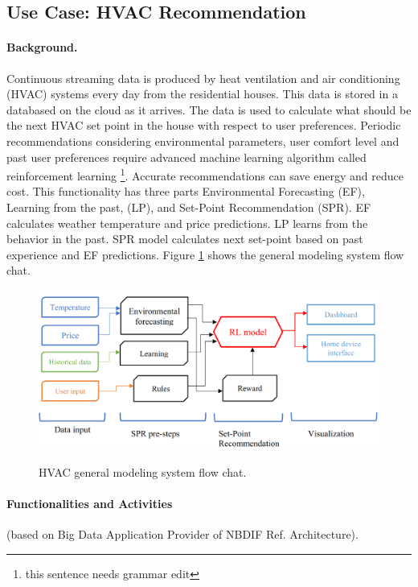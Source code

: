 \subsection{Use Case: HVAC Recommendation}


\paragraph*{Background.}

Continuous streaming data is produced by heat ventilation and air conditioning (HVAC) systems every
day from the residential houses. This data is stored in a databased on the cloud as it arrives. The data
is used to calculate what should be the next HVAC set point in the house with respect to user
preferences. Periodic recommendations considering environmental parameters, user comfort level
and past user preferences require advanced machine learning algorithm called reinforcement
learning \footnote{this sentence needs grammar edit}. Accurate recommendations can save energy and reduce cost. This functionality has three
parts Environmental Forecasting (EF), Learning from the past, (LP), and Set-Point Recommendation
(SPR). EF calculates weather temperature and price predictions. LP learns from the behavior in the
past. SPR model calculates next set-point based on past experience and EF predictions. Figure \ref{fig:hvac-1} shows
the general modeling system flow chat.

\begin{figure}[htb]
\includegraphics[width=1.0\textwidth]{usecase/hvac.png}
\label{fig:hvac-1}
\caption{HVAC general modeling system flow chat.}
\end{figure}


\paragraph*{Functionalities and Activities} (based on Big Data Application Provider of NBDIF Ref. Architecture).


